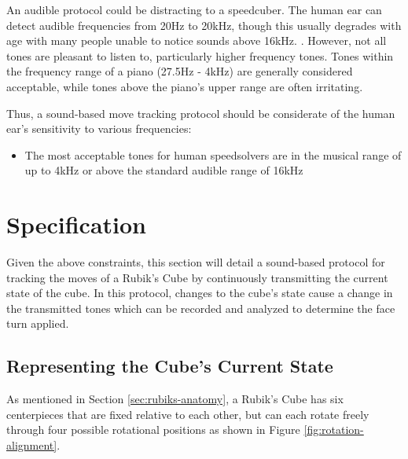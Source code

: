 An audible protocol could be distracting to a speedcuber. The human ear
can detect audible frequencies from 20Hz to 20kHz, though this usually
degrades with age with many people unable to notice sounds above 16kHz.
\cite{audible-range}. However, not all tones are pleasant to listen to,
particularly higher frequency tones. Tones within the frequency range
of a piano (27.5Hz - 4kHz) are generally considered acceptable, while
tones above the piano's upper range are often irritating.
\cite{piano-range}

Thus, a sound-based move tracking protocol should be considerate of the
human ear's sensitivity to various frequencies:

\begin{itemize}

    \item The most acceptable tones for human speedsolvers are in the
    musical range of up to 4kHz or above the standard audible range of
    16kHz

\end{itemize}


\section{Specification}
\label{sec:specification}

Given the above constraints, this section will detail a sound-based
protocol for tracking the moves of a Rubik's Cube by continuously
transmitting the current state of the cube. In this protocol, changes
to the cube's state cause a change in the transmitted tones which can
be recorded and analyzed to determine the face turn applied.

\subsection{Representing the Cube's Current State}
\label{subsec:representing-cube-state}

As mentioned in Section \ref{sec:rubiks-anatomy}, a Rubik's Cube has
six centerpieces that are fixed relative to each other, but can each
rotate freely through four possible rotational positions as shown in
Figure \ref{fig:rotation-alignment}.

